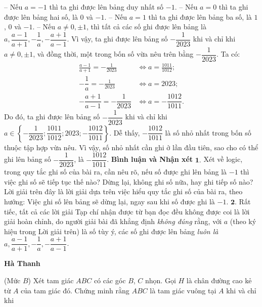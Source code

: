 \begin{multicols}{2}
	\vskip 0.05cm
	-- Nếu $a = -1$  thì ta ghi được lên bảng duy nhất số $-1$.
	\vskip 0.05cm 
	-- Nếu $a = 0$ thì ta ghi được lên bảng hai số, là $0$ và $-1$.
	\vskip 0.05cm 
	-- Nếu $a = 1$ thì ta ghi được lên bảng ba số, là $1$, $0$ và $-1$.
	\vskip 0.05cm 
	-- Nếu $a\ne 0, \pm 1$,  thì tất cả các số ghi được lên bảng là $a, \dfrac{a-1}{a+1}, -\dfrac{1}{a}, -\dfrac{a+1}{a-1}$.
	\vskip 0.05cm      
	Vì vậy, ta ghi được lên bảng số $-\dfrac{1}{2023}$  khi và chỉ khi $a \ne 0, \pm 1$, và đồng thời, một trong bốn số vừa nêu trên bằng $-\dfrac{1}{2023}$.
	\vskip 0.05cm
	Ta có:
	\begin{align*}
		\frac{{a - 1}}{{a + 1}} =  - \frac{1}{{2023}}& \Leftrightarrow a = \frac{1011}{1012};\\
		-\dfrac{1}{a} = - \frac{1}{2023} &\Leftrightarrow a = 2023;\\
		-\dfrac{a +1}{a-1} = -\dfrac{1}{2023} &\Leftrightarrow a = - \dfrac{1012}{1011}.
	\end{align*}
	Do đó, ta ghi được lên bảng số $-\dfrac{1}{2023}$  khi và chỉ khi $a \in \left\{ { - \dfrac{1}{{2023}};\dfrac{{1011}}{{1012}};2023; - \dfrac{{1012}}{{1011}}} \right\}$.   Dễ thấy,  $-\dfrac{1012}{1011}$ là số nhỏ nhất trong bốn số thuộc tập hợp vừa nêu. Vì vậy, số nhỏ nhất cần ghi ở lần đầu tiên, sao cho có thể ghi lên bảng số  $-\dfrac{1}{2023}$, là  $-\dfrac{1012}{1011}$.
	\vskip 0.1cm
	\textbf{\color{thachthuctoanhoc}Bình luận và Nhận xét}
	\vskip 0.1cm
	$\pmb{1.}$ Xét về logic, trong quy tắc ghi số của bài ra, cần nêu rõ, nếu số được ghi lên bảng là $-1$ thì việc ghi số sẽ tiếp tục thế nào? Dừng lại, không ghi số nữa, hay ghi tiếp số nào? Lời giải trên đây là lời giải dựa trên việc hiểu quy tắc ghi số của bài ra, theo hướng: Việc ghi số lên bảng sẽ dừng lại, ngay sau khi số được ghi là $-1$.
	\vskip 0.05cm
	$\pmb{2.}$ Rất tiếc, tất cả các lời giải Tạp chí nhận được từ bạn đọc đều không được coi là lời giải hoàn chỉnh, do người giải bài đã khẳng định \textit{không đúng} rằng, với $a$ (theo ký hiệu trong Lời giải trên) là số tùy ý, các số ghi được lên bảng \textit{luôn là} $a, \dfrac{a-1}{a+1}, - \dfrac{1}{a}, - \dfrac{a+1}{a-1}$.      
	\begin{flushright}
		\textbf{\color{thachthuctoanhoc}Hà Thanh}
	\end{flushright}
	{}
	(Mức $B$)
	Xét tam giác $ABC$ có các góc $B$, $C$ nhọn. Gọi $H$ là chân đường cao kẻ từ $A$ của tam giác đó. Chứng minh rằng $ABC$ là tam giác vuông tại $A$ khi và chỉ khi
	\begin{align*}

\end{align*}
\end{multicols}
